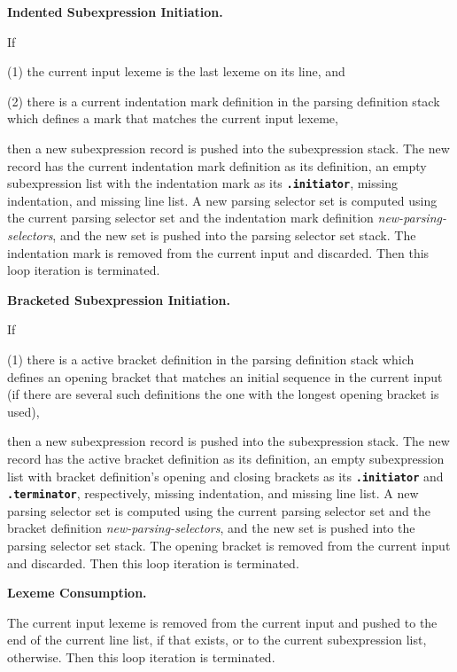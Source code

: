 \documentclass[12pt]{article}
\newcommand{\TT}[1]{{\tt \bfseries #1}}
\newenvironment{indpar}[1][0.3in]%
	{\begin{list}{}%
		     {\setlength{\itemsep}{0in}%
		      \setlength{\topsep}{0in}%
		      \setlength{\parsep}{1ex}%
		      \setlength{\labelwidth}{#1}%
		      \setlength{\leftmargin}{#1}%
		      \addtolength{\leftmargin}{\labelsep}}%
	 \item}%
	{\end{list}}
\begin{document}
\begin{indpar}
{\bf Indented Subexpression Initiation.}%
\begin{indpar}
If
\begin{list}{}
	     {\setlength{\itemsep}{0ex}%
	      \setlength{\topsep}{0ex}%
	      \setlength{\parsep}{0ex}%
	      \setlength{\leftmargin}{0.5in}%
	      \setlength{\rightmargin}{0.5in}}%
\item[(1)] the current input lexeme is the last lexeme on its line, and
\item[(2)] there is a current indentation mark definition in the
parsing definition stack which defines a mark that matches the
current input lexeme,
\end{list}
then a new subexpression record is pushed into the subexpression stack.
The new record has the current indentation mark definition as its
definition, an empty subexpression list with the indentation mark as
its \TT{.initiator}, missing indentation, and missing line list.
A new parsing selector set is computed using the current
parsing selector set and the indentation mark definition
{\em new-parsing-selectors}, and the new set is pushed into the
parsing selector set stack.
The indentation mark is removed from the current input and
discarded.
Then this loop iteration is terminated.
\end{indpar}

{\bf Bracketed Subexpression Initiation.}%
\begin{indpar}
If
\begin{list}{}
	     {\setlength{\itemsep}{0ex}%
	      \setlength{\topsep}{0ex}%
	      \setlength{\parsep}{0ex}%
	      \setlength{\leftmargin}{0.5in}%
	      \setlength{\rightmargin}{0.5in}}%
\item[(1)] there is a active bracket definition in the
parsing definition stack which defines an opening bracket that matches an
initial sequence in the current input
(if there are several such definitions the one with the longest
opening bracket is used),
\end{list}
then a new subexpression record is pushed into the subexpression stack.
The new record has the active bracket definition as its
definition, an empty subexpression list with bracket definition's
opening and closing brackets as its \TT{.initiator} and \TT{.ter\-min\-ator},
respectively, missing indentation, and missing line list.
A new parsing selector set is computed using the current
parsing selector set and the bracket definition
{\em new-parsing-selectors}, and the new set is pushed into the
parsing selector set stack.
The opening bracket is removed from the current input and
discarded.
Then this loop iteration is terminated.
\end{indpar}

{\bf Lexeme Consumption.}%
\begin{indpar}
The current input lexeme is removed from the current input and
pushed to the end of the current line list, if that exists, or to the
current subexpression list, otherwise.
Then this loop iteration is terminated.
\end{indpar}


\end{indpar}
\end{document}
